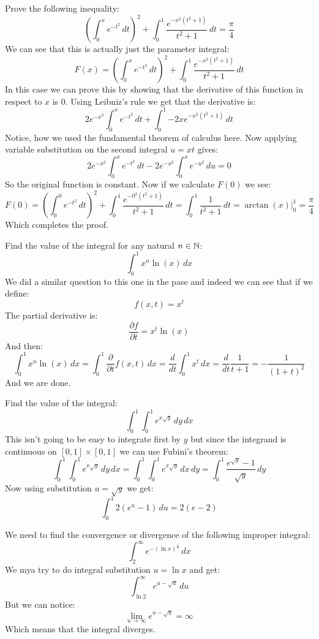\documentclass[11pt,a4paper]{article}
\begin{document}
	\newpage
	
	Prove the following inequality:
	\[
		\left(\int_{0}^{x}{e^{-t^2}\,dt}\right)^2 + 
		\int_{0}^{1}{\frac{e^{-x^2(t^2+1)}}{t^2+1}\,dt} = 
		\frac{\pi}{4}
	\]
	We can see that this is actually just the parameter integral:
	\[
		F(x) = \left(\int_{0}^{x}{e^{-t^2}\,dt}\right)^2 + 
		\int_{0}^{1}{\frac{e^{-x^2(t^2+1)}}{t^2+1}\,dt}
	\]
	In this
	case we can prove this by showing that the derivative of this function
	in respect to $x$ is $0$. Using Leibniz's rule we get that
	the derivative is:
	\[
		2e^{-x^2}\int_{0}^{x}{e^{-t^2}\,dt} + 
		\int_{0}^{1}{-2xe^{-x^2(t^2+1)}\,dt}
	\]
	Notice, how we used the fundamental theorem of calculus here.
	Now applying variable substitution on the second integral $u=xt$ gives:
	\[
		2e^{-x^2}\int_{0}^{x}{e^{-t^2}\,dt} - 
		2e^{-x^2}\int_{0}^{x}{e^{-u^2}\,du} = 0
	\]
	So the original function is constant. Now if we calculate $F(0)$
	we see:
	\[
		F(0) = \left(\int_{0}^{0}{e^{-t^2}\,dt}\right)^2 + 
		\int_{0}^{1}{\frac{e^{-0^2(t^2+1)}}{t^2+1}\,dt} = 
		\int_{0}^{1}{\frac{1}{t^2+1}\,dt} = 
		\arctan(x)\vert_0^1 = \frac{\pi}{4}
	\]
	Which completes the proof.
	
	\newpage
	
	Find the value of the integral for any natural $n\in\mathbb{N}$:
	\[
		\int_{0}^{1}{x^n\ln(x)\,dx}
	\]
	We did a similar question to this one in the pase and indeed we can
	see that if we define:
	\[
		f(x,t) = x^t
	\]
	The partial derivative is:
	\[
		\frac{\partial f}{\partial t} = x^t \ln(x)
	\]
	And then:
	\[
		\int_{0}^{1}{x^n\ln(x)\,dx} = 
		\int_{0}^{1}{\frac{\partial}{\partial t}f(x,t)\,dx} = 
		\frac{d}{dt}\int_{0}^{1}{x^t\,dx} = 
		\frac{d}{dt}\frac{1}{t+1} =
		-\frac{1}{(1+t)^2}
	\]
	And we are done.
	
	\newpage
	
	Find the value of the integral:
	\[
		\int_{0}^{1}
		{
			\int_{0}^{1}
			{
				e^{x\sqrt{y}}
			}\,dy
		}\,dx
	\]
	This isn't going to be easy to integrate first by $y$ but since
	the integrand is continuous on $[0,1]\times[0,1]$ we can use
	Fubini's theorem:
	\[
		\int_{0}^{1}
		{
			\int_{0}^{1}
			{
				e^{x\sqrt{y}}
			}\,dy
		}\,dx =
		\int_{0}^{1}
		{
			\int_{0}^{1}
			{
				e^{x\sqrt{y}}
			}\,dx
		}\,dy =
		\int_{0}^{1}
		{
			\frac{e^{\sqrt{y}}-1}{\sqrt{y}}
		}\,dy
	\]
	Now using substitution $u = \sqrt{y}$ we get:
	\[
		\int_{0}^{1}
		{
			2(e^u-1)
		}\,du =
		2(e - 2)
	\]
	
	\newpage
	
	We need to find the convergence or divergence of the following improper
	integral:
	\[
		\int_{2}^{\infty}{e^{-(\ln x)^{\frac{1}{2}}}\,dx}
	\]
	We mya try to do integral substitution $u = \ln x$ and get:
	\[
		\int_{\ln 2}^{\infty}{e^{u-\sqrt{u}}\,du}
	\]
	But we can notice:
	\[
		\lim_{u\to\infty}{e^{u-\sqrt{u}}} = \infty
	\]
	Which means that the integral diverges.
	
\end{document}
